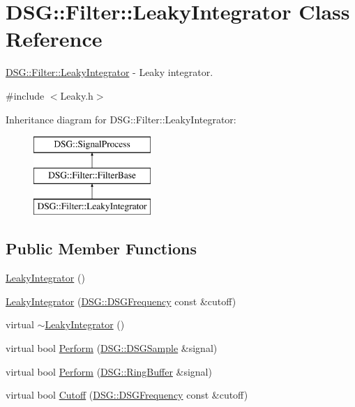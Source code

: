 \hypertarget{class_d_s_g_1_1_filter_1_1_leaky_integrator}{\section{D\+S\+G\+:\+:Filter\+:\+:Leaky\+Integrator Class Reference}
\label{class_d_s_g_1_1_filter_1_1_leaky_integrator}
}


\hyperlink{class_d_s_g_1_1_filter_1_1_leaky_integrator}{D\+S\+G\+::\+Filter\+::\+Leaky\+Integrator} -\/ Leaky integrator.  




{\ttfamily \#include $<$Leaky.\+h$>$}

Inheritance diagram for D\+S\+G\+:\+:Filter\+:\+:Leaky\+Integrator\+:\begin{figure}[H]
\begin{center}
\leavevmode
\includegraphics[height=3.000000cm]{class_d_s_g_1_1_filter_1_1_leaky_integrator}
\end{center}
\end{figure}
\subsection*{Public Member Functions}
\begin{DoxyCompactItemize}
\item 
\hyperlink{class_d_s_g_1_1_filter_1_1_leaky_integrator_af0d204e3c2f5f844dc4355810f6515c2}{Leaky\+Integrator} ()
\item 
\hyperlink{class_d_s_g_1_1_filter_1_1_leaky_integrator_ae50d8e7817b06cc64a45a6bc7aa657ff}{Leaky\+Integrator} (\hyperlink{namespace_d_s_g_a4315a061386fa1014fda09b15d3a6973}{D\+S\+G\+::\+D\+S\+G\+Frequency} const \&cutoff)
\item 
virtual \hyperlink{class_d_s_g_1_1_filter_1_1_leaky_integrator_a3a79cdbcf90a7924c05ec87b89fca83d}{$\sim$\+Leaky\+Integrator} ()
\item 
virtual bool \hyperlink{class_d_s_g_1_1_filter_1_1_leaky_integrator_a14ffd2f68de0cb9941d3295307ef13f0}{Perform} (\hyperlink{namespace_d_s_g_ac39a94cd27ebcd9c1e7502d0c624894a}{D\+S\+G\+::\+D\+S\+G\+Sample} \&signal)
\item 
virtual bool \hyperlink{class_d_s_g_1_1_filter_1_1_leaky_integrator_a7f094493387222422b9f283ec199dfd0}{Perform} (\hyperlink{class_d_s_g_1_1_ring_buffer}{D\+S\+G\+::\+Ring\+Buffer} \&signal)
\item 
virtual bool \hyperlink{class_d_s_g_1_1_filter_1_1_leaky_integrator_a5f326faae2d72a6550b2e0593b00eea6}{Cutoff} (\hyperlink{namespace_d_s_g_a4315a061386fa1014fda09b15d3a6973}{D\+S\+G\+::\+D\+S\+G\+Frequency} const \&cutoff)
\end{DoxyCompactItemize}

